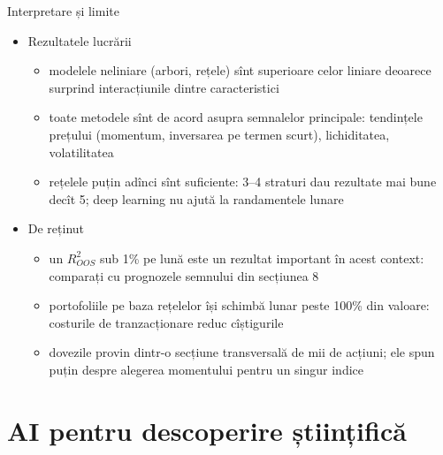 \begin{frame}{Interpretare și limite}
\itemsize{\small}
\begin{itemize}
    \item Rezultatele lucrării
    \begin{itemize}
        \item modelele neliniare (arbori, rețele) sînt superioare celor liniare deoarece surprind interacțiunile dintre caracteristici
        \item toate metodele sînt de acord asupra semnalelor principale: tendințele prețului (momentum, inversarea pe termen scurt), lichiditatea, volatilitatea
        \item rețelele puțin adînci sînt suficiente: 3--4 straturi dau rezultate mai bune decît 5; deep learning nu ajută la randamentele lunare
    \end{itemize}
    \item De reținut
    \begin{itemize}
        \item un $R^2_{OOS}$ sub 1\% pe lună este un rezultat important în acest context: comparați cu prognozele semnului din secțiunea 8
        \item portofoliile pe baza rețelelor își schimbă lunar peste 100\% din valoare: costurile de tranzacționare reduc cîștigurile
        \item dovezile provin dintr-o secțiune transversală de mii de acțiuni; ele spun puțin despre alegerea momentului pentru un singur indice
    \end{itemize}
\end{itemize}
\end{frame}


\section{AI pentru descoperire științifică}

